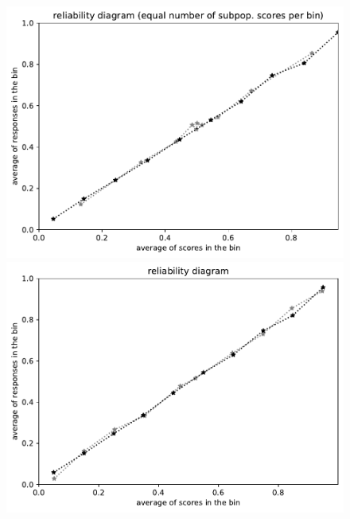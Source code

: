\documentclass{article}
\newlength{\vertsep}
\newlength{\imsize}
\begin{document}
\begin{figure}
\begin{centering}
\parbox{\imsize}{\includegraphics[width=\imsize]
{../codes/unweighted/10000_7000_10_3/equisamps.pdf}}
\quad\quad
\parbox{\imsize}{\includegraphics[width=\imsize]
{../codes/unweighted/10000_7000_10_3/equiscore.pdf}}

\vspace{\vertsep}


\end{centering}
\end{figure}
\end{document}
